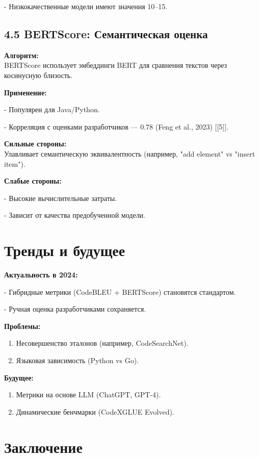 \documentclass[14pt]{article}
\theoremstyle{definition}
\begin{document}
- Низкокачественные модели имеют значения 10–15.


\subsection*{4.5 BERTScore: Семантическая оценка}

\textbf{Алгоритм:} \\
BERTScore использует эмбеддинги BERT для сравнения текстов через косинусную близость.

\textbf{Применение:}

    
- Популярен для Java/Python.
    
- Корреляция с оценками разработчиков — 0.78 (Feng et al., 2023) [[5]].


\textbf{Сильные стороны:} \\
Улавливает семантическую эквивалентность (например, "add element" vs "insert item").

\textbf{Слабые стороны:}

    
- Высокие вычислительные затраты.
    
- Зависит от качества предобученной модели.


\section*{Тренды и будущее}

\textbf{Актуальность в 2024:}

    
- Гибридные метрики (CodeBLEU + BERTScore) становятся стандартом.
    
- Ручная оценка разработчиками сохраняется.


\textbf{Проблемы:}
\begin{enumerate}
    \item Несовершенство эталонов (например, CodeSearchNet).
    \item Языковая зависимость (Python vs Go).
\end{enumerate}

\textbf{Будущее:}
\begin{enumerate}
    \item Метрики на основе LLM (ChatGPT, GPT-4).
    \item Динамические бенчмарки (CodeXGLUE Evolved).
\end{enumerate}

\section*{Заключение}
\end{document}
